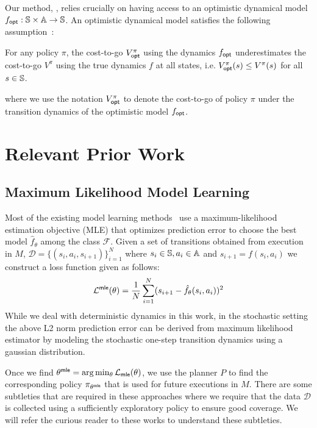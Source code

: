 Our method, \taml{}, relies crucially on having access to an
optimistic dynamical model $f_\mathsf{opt}: \mathbb{S} \times \mathbb{A}
\rightarrow \mathbb{S}$. An optimistic dynamical model satisfies
the following assumption~\cite{cmaxpp}:
\begin{assumption}
  For any policy $\pi$, the cost-to-go $V^\pi_{\mathsf{opt}}$ using the dynamics
  $f_\mathsf{opt}$ underestimates the cost-to-go $V^\pi$ using the true
  dynamics $f$ at all states, i.e. $V^\pi_{\mathsf{opt}}(s) \leq V^\pi(s)$ for
  all $s \in \mathbb{S}$.
  \label{assumption:taml-optimistic}
\end{assumption}
where we use the notation $V_{\mathsf{opt}}^\pi$ to denote the cost-to-go of
policy $\pi$ under the transition dynamics of the optimistic model
$f_\mathsf{opt}$.

\section{Relevant Prior Work}
\label{sec:prior-work}

\subsection{Maximum Likelihood Model Learning}
\label{sec:maxim-likel-model}

Most of the existing model learning
methods~\cite{DBLP:journals/arc/Ljung10, DBLP:conf/icml/AbbeelN05,
  DBLP:conf/icml/RossB12,  DBLP:journals/corr/abs-1907-02057} use a maximum-likelihood
estimation objective (MLE) that optimizes prediction error to choose the best
model $\hat{f}_\theta$ among the class $\mathcal{F}$. Given a set of
transitions obtained from execution in $M$, $\mathcal{D} = \{(s_i, a_i,
s_{i+1})\}_{i=1}^N$ where $s_i \in \mathbb{S}, a_i \in \mathbb{A}$
and $s_{i+1} = f(s_i, a_i)$ we construct a loss function 
given as follows:
\begin{equation}
  \label{eq:21}
  \mathcal{L}^{\mathsf{mle}}(\theta) = \frac{1}{N} \sum_{i=1}^{N} (s_{i+1} -
  \hat{f}_\theta(s_i, a_i))^2
\end{equation}
While we deal with deterministic dynamics in this work, in the
stochastic setting the above L2 norm prediction error can be derived
from maximum likelihood estimator by modeling the stochastic one-step
transition dynamics using a gaussian distribution.

Once we find $\theta^{\mathsf{mle}} = \arg\min_{\theta}
\mathcal{L}_{\mathsf{mle}}(\theta)$, we use the planner $P$ to find the
corresponding policy $\pi_{\theta^{\mathsf{mle}}}$ that is used for future
executions in $M$. There are some subtleties that are required in
these approaches where we require that the data $\mathcal{D}$ is
collected using a sufficiently exploratory policy to ensure good
coverage. We will refer the curious reader to these works to
understand these subtleties.

